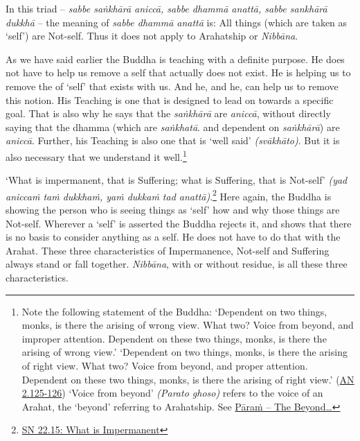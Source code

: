 In this triad -- \emph{sabbe saṅkhārā aniccā, sabbe dhammā anattā, sabbe sankhārā dukkhā} -- the meaning of \emph{sabbe dhammā anattā} is: All things (which are taken as `self') are Not-self. Thus it does not apply to Arahatship or \emph{Nibbāna}.

As we have said earlier the Buddha is teaching with a definite purpose. He does not have to help us remove a self that actually does not exist. He is helping us to remove the  of `self' that exists with us. And he, and  he, can help us to remove this notion. His Teaching is one that is designed to lead on towards a specific goal. That is also why he says that the \emph{saṅkhārā} are \emph{aniccā}, without directly saying that the dhamma (which are \emph{saṅkhatā}. and dependent on \emph{saṅkhārā}) are \emph{aniccā}. Further, his Teaching is also one that is `well said' \emph{(svākhāto)}. But it is also necessary that we understand it well.\footnote{Note the following statement of the Buddha: `Dependent on two things, monks, is there the arising of wrong view. What two? Voice from beyond, and improper attention. Dependent on these two things, monks, is there the arising of wrong view.' `Dependent on two things, monks, is there the arising of right view. What two? Voice from beyond, and proper attention. Dependent on these two things, monks, is there the arising of right view.' (\href{https://suttacentral.net/an2.118-129/en/sujato}{AN 2.125-126}) `Voice from beyond' \emph{(Parato ghoso)} refers to the voice of an Arahat, the `beyond' referring to Arahatship. See \protect\hyperlink{beyond}{Pāraṁ -- The Beyond\ldots\hspace{0pt}}}

`What is impermanent, that is Suffering; what is Suffering, that is Not-self' \emph{(yad aniccaṁ taṁ dukkhaṁ, yaṁ dukkaṁ tad anattā)}.\footnote{\href{https://suttacentral.net/sn22.15/en/bodhi}{SN 22.15: What is Impermanent}} Here again, the Buddha is showing the person who is seeing things as `self' how and why those things are Not-self. Wherever a `self' is asserted the Buddha rejects it, and shows that there is no basis to consider anything as a self. He does not have to do that with the Arahat. These three characteristics of Impermanence, Not-self and Suffering always stand or fall together. \emph{Nibbāna}, with or without residue, is  all these three characteristics.
